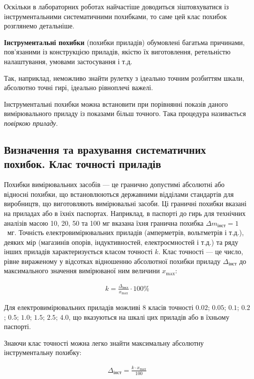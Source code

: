 \documentclass{LabBook}
\begin{document}
Оскільки в лабораторних роботах найчастіше доводиться зіштовхуватися із інструментальними систематичними похибками, то саме цей клас похибок розглянемо детальніше.

\textbf{Інструментальні похибки} (похибки приладів) обумовлені багатьма причинами, пов’язаними із конструкцією приладів, якістю їх виготовлення, ретельністю налаштування, умовами застосування і т.д.

Так, наприклад, неможливо знайти рулетку з ідеально точним розбиттям шкали, абсолютно точні гирі, ідеально рівноплечі важелі.

Інструментальні похибки можна встановити при порівнянні показів даного вимірювального приладу із показами більш точного. Така процедура називається \emph{повіркою приладу}.

\subsection{Визначення та врахування систематичних похибок. Клас точності приладів}


Похибки вимірювальних засобів --- це гранично допустимі абсолютні або відносні похибки, що встановлюються державними відділами стандартів для виробництв, що виготовляють вимірювальні засоби. Ці граничні похибки вказані на приладах або в їхніх паспортах. Наприклад, в паспорті до гирь для технічних аналізів масою 10, 20, 50 та 100 мг вказана їхня гранична похибка $\Delta m_\text{інст} = 1$~мг.
Точність електровимірювальних приладів (амперметрів, вольтметрів і т.д.), деяких мір (магазинів опорів, індуктивностей, електроємностей і т.д.) та ряду інших приладів характеризується класом точності $k$.
Клас точності --- це число, рівне вираженому у відсотках відношенню абсолютної похибки приладу $\Delta _\text{інст}$ до  максимального значення вимірюваної ним величини $x_{\max}$:

\begin{align*}
   k= \frac{\Delta_\text{інст}}{x_{\max}} \cdot 100\%
\end{align*}



Для електровимірювальних приладів  можливі 8 класів точності $ 0.02 $; $ 0.05 $; $ 0.1 $; $ 0.2 $; $ 0.5 $; $ 1.0 $; $ 1.5 $; $ 2.5 $; $ 4.0 $, що  вказуються  на  шкалі цих приладів або в їхньому паспорті.

Знаючи клас точності можна легко знайти максимальну абсолютну інструментальну похибку:

\begin{align*}
  \Delta_\text{інст} =  \frac{k \cdot x_{\max}}{100}
\end{align*}
\end{document}
